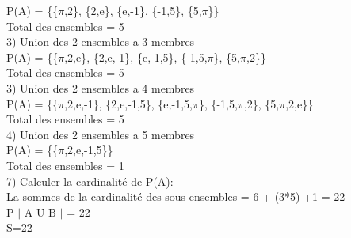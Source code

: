P(A) = \{\{$\pi$,2\}, \{2,e\}, \{e,-1\}, \{-1,5\}, \{5,$\pi$\}\} \\

Total des ensembles = 5 \\

3) Union des 2 ensembles a 3 membres \\

P(A) = \{\{$\pi$,2,e\}, \{2,e,-1\}, \{e,-1,5\}, \{-1,5,$\pi$\}, \{5,$\pi$,2\}\} \\

Total des ensembles = 5 \\

3) Union des 2 ensembles a 4 membres \\

P(A) = \{\{$\pi$,2,e,-1\}, \{2,e,-1,5\}, \{e,-1,5,$\pi$\}, \{-1,5,$\pi$,2\}, \{5,$\pi$,2,e\}\} \\

Total des ensembles = 5 \\

4) Union des 2 ensembles a 5 membres \\

P(A) = \{\{$\pi$,2,e,-1,5\}\} \\

Total des ensembles = 1 \\

7) Calculer la cardinalité de P(A):\\

La sommes de la cardinalité des sous ensembles = 6 + (3*5) +1 = 22\\

P $|$ A U B $|$ = 22 \\

S=22 \\
